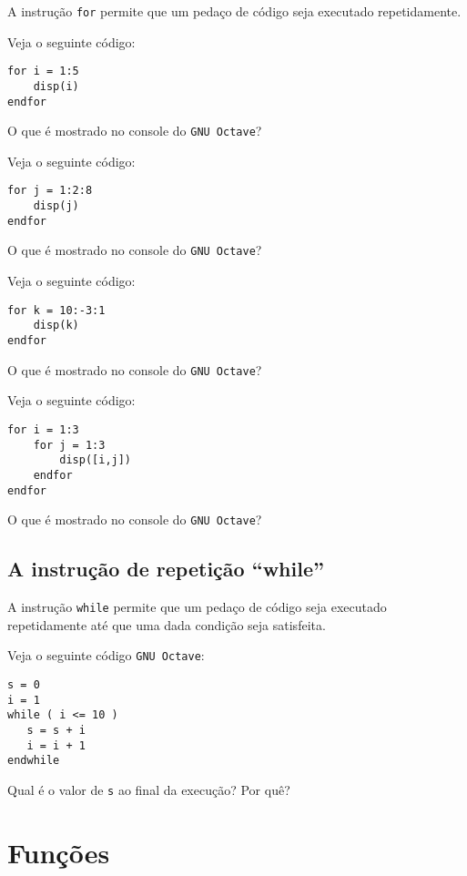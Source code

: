 A instrução \verb+for+ permite que um pedaço de código seja executado repetidamente.

\begin{ex}
  Veja o seguinte código:
\begin{verbatim}
for i = 1:5
    disp(i)
endfor
\end{verbatim}
O que é mostrado no console do \verb+GNU Octave+?
\end{ex}

\begin{ex}
  Veja o seguinte código:
\begin{verbatim}
for j = 1:2:8
    disp(j)
endfor
\end{verbatim}
O que é mostrado no console do \verb+GNU Octave+?
\end{ex}

\begin{ex}
  Veja o seguinte código:
\begin{verbatim}
for k = 10:-3:1
    disp(k)
endfor
\end{verbatim}
O que é mostrado no console do \verb+GNU Octave+?
\end{ex}

\begin{ex}
  Veja o seguinte código:
\begin{verbatim}
for i = 1:3
    for j = 1:3
        disp([i,j])
    endfor
endfor
\end{verbatim}
O que é mostrado no console do \verb+GNU Octave+?
\end{ex}

\subsection{A instrução de repetição ``while''}

A instrução \verb+while+ permite que um pedaço de código seja executado repetidamente até que uma dada condição seja satisfeita.

\begin{ex}
Veja o seguinte código \verb+GNU Octave+:
\begin{verbatim}
s = 0
i = 1
while ( i <= 10 )
   s = s + i
   i = i + 1
endwhile
\end{verbatim}
Qual é o valor de \verb+s+ ao final da execução? Por quê?
\end{ex}

\section{Funções}


